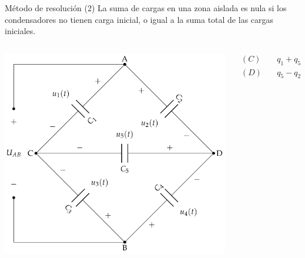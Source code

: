 \documentclass[aspectratio=169, usenames,svgnames,dvipsnames]{beamer}
\begin{document}
\begin{frame}[label={sec:orgf102ec5}]{Método de resolución (2)}
La suma de cargas en una zona aislada es nula si los condensadores no tienen carga inicial, o igual a la suma total de las cargas iniciales.
\begin{columns}
\begin{column}{0.5\columnwidth}
\begin{center}
\includegraphics[height=0.75\textheight]{../figs/CondensadoresZonaAislada_Tensiones.pdf}
\end{center}
\end{column}
\begin{column}{0.5\columnwidth}
\begin{align*}
  (C) &\quad q_1 + q_5 + q_3 = 0\\
  (D) &\quad q_5 - q_2 - q_4 = 0
\end{align*}
\end{column}
\end{columns}
\end{frame}
\end{document}
